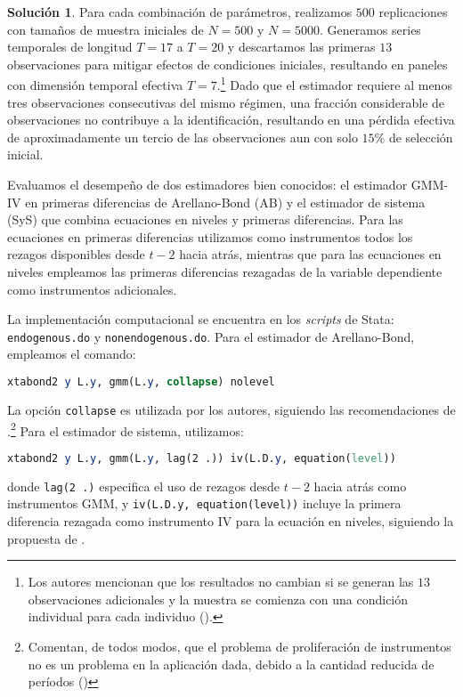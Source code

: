\documentclass[12pt,letterpaper,reqno,oneside]{amsart}
\theoremstyle{problemstyle} %
\theoremstyle{definition} %
\newtheorem{solution}{Solución}[problem]
\begin{document}
\begin{solution}
  Para cada combinación de parámetros, realizamos $500$ replicaciones con tamaños de muestra iniciales de $N = 500$ y $N = 5000$.
  Generamos series temporales de longitud $T = 17$ a $T = 20$ y descartamos las primeras $13$ observaciones para mitigar efectos de condiciones iniciales, resultando en paneles con dimensión temporal efectiva $T = 7$.\footnote{Los autores mencionan que los resultados no cambian si se generan las $13$ observaciones adicionales y la muestra se comienza con una condición individual para cada individuo (\cite[11]{al-sadoonSimpleMethodsConsistent2019}).}
  Dado que el estimador requiere al menos tres observaciones consecutivas del mismo régimen, una fracción considerable de observaciones no contribuye a la identificación, resultando en una pérdida efectiva de aproximadamente un tercio de las observaciones aun con solo $15\%$ de selección inicial.

  Evaluamos el desempeño de dos estimadores bien conocidos: el estimador GMM-IV en primeras diferencias de Arellano-Bond (AB) y el estimador de sistema (SyS) que combina ecuaciones en niveles y primeras diferencias.
  Para las ecuaciones en primeras diferencias utilizamos como instrumentos todos los rezagos disponibles desde $t-2$ hacia atrás, mientras que para las ecuaciones en niveles empleamos las primeras diferencias rezagadas de la variable dependiente como instrumentos adicionales.

  La implementación computacional se encuentra en los \emph{scripts} de Stata: \texttt{endogenous.do} y \texttt{nonendogenous.do}.
  Para el estimador de Arellano-Bond, empleamos el comando:
  \begin{lstlisting}[language=Stata]
xtabond2 y L.y, gmm(L.y, collapse) nolevel
\end{lstlisting}
  La opción \texttt{collapse} es utilizada por los autores, siguiendo las recomendaciones de \textcite{roodmanHowXtabond2Introduction2009}.\footnote{Comentan, de todos modos, que el problema de proliferación de instrumentos no es un problema en la aplicación dada, debido a la cantidad reducida de períodos (\cite[12]{al-sadoonSimpleMethodsConsistent2019})}
  Para el estimador de sistema, utilizamos:
  \begin{lstlisting}[language=Stata]
xtabond2 y L.y, gmm(L.y, lag(2 .)) iv(L.D.y, equation(level))
\end{lstlisting}
  donde \texttt{lag(2 .)} especifica el uso de rezagos desde $t-2$ hacia atrás como instrumentos GMM, y \texttt{iv(L.D.y, equation(level))} incluye la primera diferencia rezagada como instrumento IV para la ecuación en niveles, siguiendo la propuesta de \textcite{arellanoAnotherLookInstrumental1995}.


\end{solution}
\end{document}
